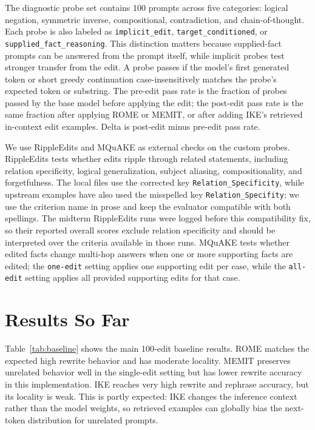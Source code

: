 \documentclass[11pt]{article}
\begin{document}
The diagnostic probe set contains 100 prompts across five categories: logical negation, symmetric inverse, compositional, contradiction, and chain-of-thought. Each probe is also labeled as \texttt{implicit\_edit}, \texttt{target\_conditioned}, or \texttt{supplied\_fact\_reasoning}. This distinction matters because supplied-fact prompts can be answered from the prompt itself, while implicit probes test stronger transfer from the edit. A probe passes if the model's first generated token or short greedy continuation case-insensitively matches the probe's expected token or substring. The pre-edit pass rate is the fraction of probes passed by the base model before applying the edit; the post-edit pass rate is the same fraction after applying ROME or MEMIT, or after adding IKE's retrieved in-context edit examples. Delta is post-edit minus pre-edit pass rate.

We use RippleEdits and MQuAKE as external checks on the custom probes. RippleEdits tests whether edits ripple through related statements, including relation specificity, logical generalization, subject aliasing, compositionality, and forgetfulness. The local files use the corrected key \texttt{Relation\_Specificity}, while upstream examples have also used the misspelled key \texttt{Relation\_Specifity}; we use the criterion name in prose and keep the evaluator compatible with both spellings. The midterm RippleEdits runs were logged before this compatibility fix, so their reported overall scores exclude relation specificity and should be interpreted over the criteria available in those runs. MQuAKE tests whether edited facts change multi-hop answers when one or more supporting facts are edited; the \texttt{one-edit} setting applies one supporting edit per case, while the \texttt{all-edit} setting applies all provided supporting edits for that case.

\section{Results So Far}

Table~\ref{tab:baseline} shows the main 100-edit baseline results. ROME matches the expected high rewrite behavior and has moderate locality. MEMIT preserves unrelated behavior well in the single-edit setting but has lower rewrite accuracy in this implementation. IKE reaches very high rewrite and rephrase accuracy, but its locality is weak. This is partly expected: IKE changes the inference context rather than the model weights, so retrieved examples can globally bias the next-token distribution for unrelated prompts.
\end{document}

